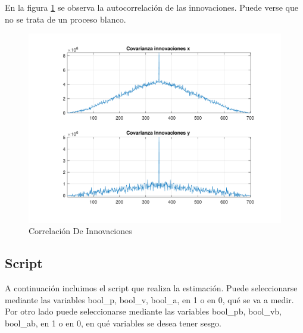 	En la figura \ref{fig:ej3f_cov} se observa la autocorrelación de las innovaciones. Puede verse que no se trata de un proceso blanco.

	\begin{figure}[H]
		\centering
		\includegraphics[width=1.0\textwidth,keepaspectratio]{Figuras/covinn_ej4f.pdf}
		\caption{Correlación De Innovaciones}
		\label{fig:ej3f_cov}
	\end{figure}
	

\subsection{Script}

	A continuación incluimos el script que realiza la estimación. Puede seleccionarse mediante las variables bool\_p, bool\_v, bool\_a, en 1 o en 0, qué se va a medir. Por otro lado puede seleccionarse mediante las variables bool\_pb, bool\_vb, bool\_ab, en 1 o en 0, en qué variables se desea tener sesgo.
	

